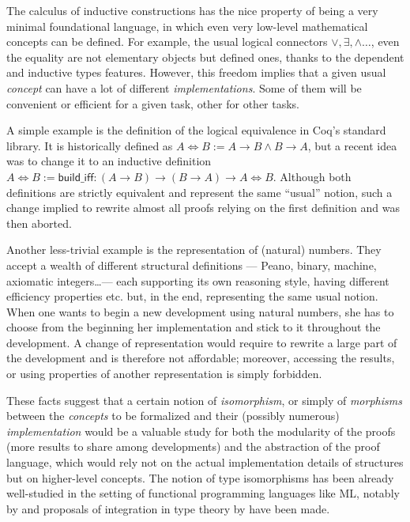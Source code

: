 \documentclass[twoside,a4paper,12pt]{article}
\begin{document}
The calculus of inductive constructions has the nice property of being
a very minimal foundational language, in which even very low-level
mathematical concepts can be defined. For example, the usual logical
connectors $\vee, \exists, \wedge\ldots$, even the equality are not
elementary objects but defined ones, thanks to the dependent and
inductive types features. However, this freedom implies that a given
usual \emph{concept} can have a lot of different
\emph{implementations}. Some of them will be convenient or efficient
for a given task, other for other tasks. 

A simple example is the definition of the logical equivalence in
\textsf{Coq}'s standard library. It is historically defined as
$A\Leftrightarrow B := A\to B \land B\to A$, but a recent idea was to
change it to an inductive definition $A\Leftrightarrow B :=
\mathsf{build\_iff} : (A\to B)\to(B\to A)\to A\Leftrightarrow
B$. Although both definitions are strictly equivalent and represent
the same ``usual'' notion, such a change implied to rewrite almost all
proofs relying on the first definition and was then aborted.

Another less-trivial example is the representation of (natural)
numbers. They accept a wealth of different structural definitions ---
Peano, binary, machine, axiomatic integers\ldots --- each supporting
its own reasoning style, having different efficiency properties
etc. but, in the end, representing the same usual notion. When one
wants to begin a new development using natural numbers, she has to
choose from the beginning her implementation and stick to it
throughout the development. A change of representation would require
to rewrite a large part of the development and is therefore not
affordable; moreover, accessing the results, or using properties of
another representation is simply forbidden.

These facts suggest that a certain notion of \emph{isomorphism}, or
simply of \emph{morphisms} between the \emph{concepts} to be
formalized and their (possibly numerous) \emph{implementation} would
be a valuable study for both the modularity of the proofs (more
results to share among developments) and the abstraction of the proof
language, which would rely not on the actual implementation details of
structures but on higher-level concepts. The notion of type
isomorphisms has been already well-studied in the setting of
functional programming languages like ML, notably by
\cite{di1995isomorphisms} and proposals of integration in type theory
by \cite{barthe2001type} have been made.
\end{document}
